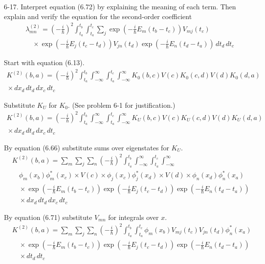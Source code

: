 \documentclass[12pt]{article}
\begin{document}
6-17.
Interpret equation (6.72) by explaining the meaning of each term.
Then explain and verify the equation for the second-order coefficient
\begin{align*}
&\lambda_{mn}^{(2)}=\left(-\frac{i}{\hbar}\right)^2
\int_{t_a}^{t_b}
\int_{t_a}^{t_c}
\sum_j
\exp\left(-\frac{i}{\hbar}E_m(t_b-t_c)\right)V_{mj}(t_c)
\\
&\quad{}\times\exp\left(-\frac{i}{\hbar}E_j(t_c-t_d)\right)V_{jn}(t_d)
\exp\left(-\frac{i}{\hbar}E_n(t_d-t_a)\right)\,dt_d\,dt_c
\tag{6.74}
\end{align*}

Start with equation (6.13).
\begin{multline*}
K^{(2)}(b,a)=\left(-\frac{i}{\hbar}\right)^2
\int_{t_a}^{t_b}
\int_{-\infty}^\infty
\int_{t_a}^{t_c}
\int_{-\infty}^\infty
K_0(b,c)V(c)K_0(c,d)V(d)K_0(d,a)
\\
{}\times dx_d\,dt_d\,dx_c\,dt_c
\end{multline*}

Substitute $K_U$ for $K_0$.
(See problem 6-1 for justification.)
\begin{multline*}
K^{(2)}(b,a)=\left(-\frac{i}{\hbar}\right)^2
\int_{t_a}^{t_b}
\int_{-\infty}^\infty
\int_{t_a}^{t_c}
\int_{-\infty}^\infty
K_U(b,c)V(c)K_U(c,d)V(d)K_U(d,a)
\\
{}\times dx_d\,dt_d\,dx_c\,dt_c
\end{multline*}

By equation (6.66) substitute sums over eigenstates for $K_U$.
\begin{align*}
&K^{(2)}(b,a)=\sum_m\sum_j\sum_n
\left(-\frac{i}{\hbar}\right)^2
\int_{t_a}^{t_b}
\int_{-\infty}^\infty
\int_{t_a}^{t_c}
\int_{-\infty}^\infty
\\
&\quad\phi_m(x_b)\phi_m^*(x_c)\times V(c)\times\phi_j(x_c)\phi_j^*(x_d)\times V(d)\times\phi_n(x_d)\phi_n^*(x_a)
\\
&\quad\times
\exp\left(-\frac{i}{\hbar}E_m(t_b-t_c)\right)
\exp\left(-\frac{i}{\hbar}E_j(t_c-t_d)\right)
\exp\left(-\frac{i}{\hbar}E_n(t_d-t_a)\right)
\\
&\quad{}\times dx_d\,dt_d\,dx_c\,dt_c
\end{align*}

By equation (6.71) substitute $V_{mn}$ for integrals over $x$.
\begin{align*}
&K^{(2)}(b,a)=\sum_m\sum_j\sum_n
\left(-\frac{i}{\hbar}\right)^2
\int_{t_a}^{t_b}
\int_{t_a}^{t_c}
\phi_m(x_b)V_{mj}(t_c)V_{jn}(t_d)\phi_n^*(x_a)
\\
&\quad\times
\exp\left(-\frac{i}{\hbar}E_m(t_b-t_c)\right)
\exp\left(-\frac{i}{\hbar}E_j(t_c-t_d)\right)
\exp\left(-\frac{i}{\hbar}E_n(t_d-t_a)\right)
\\
&\quad{}\times dt_d\,dt_c
\end{align*}
\end{document}
